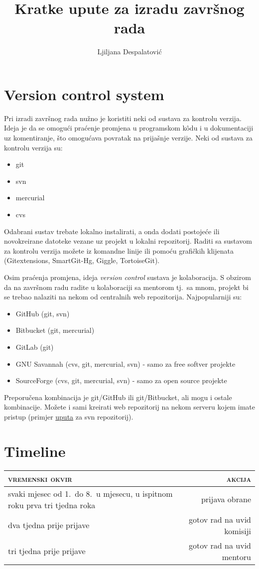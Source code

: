 \documentclass[a4paper,12pt]{article}
\title{Kratke upute za izradu završnog rada}
\author{Ljiljana Despalatović}
\date{}
\begin{document}
\maketitle

\section{Version control system}
Pri izradi završnog rada nužno je koristiti neki od sustava za kontrolu verzija. Ideja je da se omogući praćenje promjena u programskom k\^odu i u dokumentaciji uz komentiranje, što omogućava povratak na prijašnje verzije. Neki od sustava za kontrolu verzija su:  
\begin{itemize}
 \item git
 \item svn 
 \item mercurial
 \item cvs
\end{itemize}

Odabrani sustav trebate lokalno instalirati, a onda dodati postojeće ili novokreirane datoteke vezane uz projekt u lokalni repozitorij. Raditi sa sustavom za kontrolu verzija možete iz komandne linije ili pomoću grafičkih klijenata (Gitextensions, SmartGit-Hg, Giggle, TortoiseGit).

Osim praćenja promjena, ideja \textit{version control} sustava je kolaboracija. S obzirom da na završnom radu radite u kolaboraciji sa mentorom tj.~sa mnom, projekt bi se trebao nalaziti na nekom od centralnih web repozitorija. Najpopularniji su:
\begin{itemize}
 \item GitHub (git, svn)
 \item Bitbucket (git, mercurial)
 \item GitLab (git)
 \item GNU Savannah (cvs, git, mercurial, svn) - samo za free softver projekte
 \item SourceForge (cvs, git, mercurial, svn) - samo za open source projekte
\end{itemize}

Preporučena kombinacija je git/GitHub ili git/Bitbucket, ali mogu i ostale kombinacije. Možete i sami kreirati web repozitorij na nekom serveru kojem imate pristup (primjer \href{https://civicactions.com/blog/2010/may/25/how\_set\_svn\_repository\_7\_simple\_steps}{uputa} za svn repozitorij).

\section{Timeline}
 \setlength{\extrarowheight}{.5em}
\begin{tabularx}{\linewidth}{Xr}
\textsc{vremenski okvir}& \textsc{akcija}\\
\hline
svaki mjesec od 1.~do 8.~u mjesecu, u ispitnom roku prva tri tjedna roka & prijava obrane\\
dva tjedna prije prijave & gotov rad na uvid komisiji\\
tri tjedna prije prijave & gotov rad na uvid mentoru\\
\hline
\end{tabularx}
\end{document}

